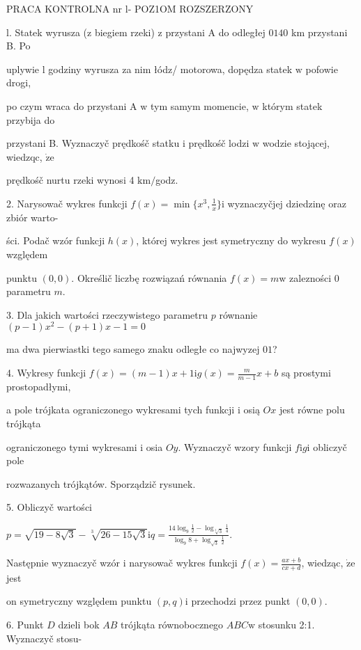 \documentclass[a4paper,12pt]{article}
\begin{document}
PRACA KONTROLNA nr l- POZ1OM ROZSZERZONY

l. Statek wyrusza ($\mathrm{z}$ biegiem rzeki) $\mathrm{z}$ przystani A do odległej $0 140$ km przystani B. Po

uplywie l godziny wyrusza za nim łódz/ motorowa, dopędza statek $\mathrm{w}$ pofowie drogi,

po czym wraca do przystani A $\mathrm{w}$ tym samym momencie, $\mathrm{w}$ którym statek przybija do

przystani B. Wyznaczyč prędkośč statku $\mathrm{i}$ prędkośč lodzi $\mathrm{w}$ wodzie stojącej, wiedzqc, $\dot{\mathrm{z}}\mathrm{e}$

prędkośč nurtu rzeki wynosi 4 $\mathrm{k}\mathrm{m}/$godz.

2. Narysowač wykres funkcji $f(x)=\displaystyle \min\{x^{3},\frac{1}{x}\}\mathrm{i}$ wyznaczyčjej dziedzinę oraz zbiór warto-

ści. Podač wzór funkcji $h(x)$, której wykres jest symetryczny do wykresu $f(x)$ względem

punktu $(0,0)$. Określič liczbę rozwiązań równania $f(x)=m\mathrm{w}$ zalezności $0$ parametru $m.$

3. Dla jakich wartości rzeczywistego parametru $p$ równanie $(p-1)x^{2}-(p+1)x-1=0$

ma dwa pierwiastki tego samego znaku odległe co najwyzej $01$?

4. Wykresy funkcji $f(x)=(m-1)x+1\displaystyle \mathrm{i}g(x)=\frac{m}{m-1}x+b$ są prostymi prostopadłymi,

a pole trójkata ograniczonego wykresami tych funkcji $\mathrm{i}$ osią $Ox$ jest równe polu trójkąta

ograniczonego tymi wykresami $\mathrm{i}$ osia $Oy$. Wyznaczyč wzory funkcji $f\mathrm{i}g\mathrm{i}$ obliczyč pole

rozwazanych trójkątów. Sporządzič rysunek.

5. Obliczyč wartości

$p=\displaystyle \sqrt{19-8\sqrt{3}}-\sqrt[3]{26-15\sqrt{3}}\mathrm{i}q=\frac{14\log_{9}\frac{1}{2}-\log_{\sqrt[3]{3}}\frac{1}{4}}{\log_{9}8+\log_{\sqrt{3}}\frac{1}{2}}.$

Następnie wyznaczyč wzór $\mathrm{i}$ narysowač wykres funkcji $f(x) =\displaystyle \frac{ax+b}{cx+d}$, wiedząc, $\dot{\mathrm{z}}\mathrm{e}$ jest

on symetryczny względem punktu $(p,q)\mathrm{i}$ przechodzi przez punkt $(0,0).$

6. Punkt $D$ dzieli bok $AB$ trójkąta równobocznego $ABC\mathrm{w}$ stosunku 2:1. Wyznaczyč stosu-
\end{document}
